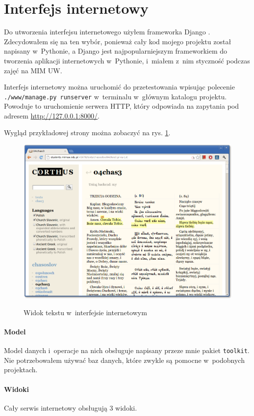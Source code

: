 \documentclass{pracamgr}
\begin{document}
\section{Interfejs internetowy}\label{r:www}

Do utworzenia interfejsu internetowego użyłem frameworka Django
\cite{django}. Zdecydowałem się na ten wybór, ponieważ cały kod mojego
projektu został napisany w~Pythonie, a Django jest najpopularniejszym
frameworkiem do tworzenia aplikacji internetowych w~Pythonie, i~miałem
z~nim styczność podczas zajęć na MIM UW.

Interfejs internetowy można uruchomić do przetestowania wpisując
polecenie {\tt ./www/manage.py runserver} w~terminalu w~głównym
katalogu projektu. Powoduje to uruchomienie serwera HTTP, który
odpowiada na zapytania pod adresem \url{http://127.0.0.1:8000/}.

Wygląd przykładowej strony można zobaczyć na rys. \ref{f:web2}.

\begin{figure}[h]
  \small
  \caption{Widok tekstu w~interfejsie internetowym}
  \includegraphics[width=\textwidth]{web2.png}
  \label{f:web2}
\end{figure}

\paragraph{Model}
Model danych i~operacje na nich obsługuje napisany przeze mnie pakiet
{\tt toolkit}. Nie potrzebowałem używać baz danych, które zwykle są
pomocne w~podobnych projektach.

\paragraph{Widoki}
Cały serwis internetowy obsługują 3 widoki.
\end{document}
